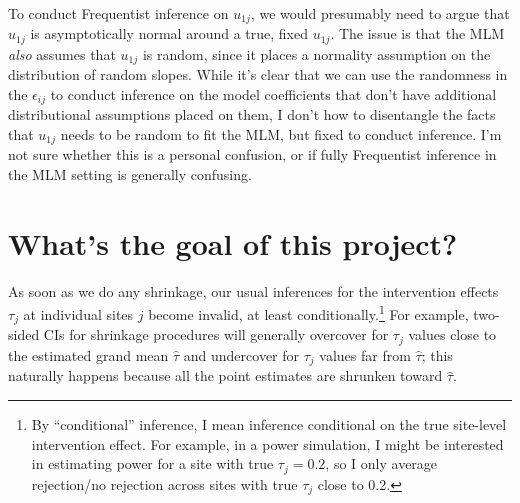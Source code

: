 \documentclass[]{article}
\begin{document}
To conduct Frequentist inference on $u_{1j}$, we would presumably need to argue that $\hat{u}_{1j}$ is asymptotically normal around a true, fixed $u_{1j}$.
The issue is that the MLM \textit{also} assumes that $u_{1j}$ is random, since it places a normality assumption on the distribution of random slopes.
While it's clear that we can use the randomness in the $\epsilon_{ij}$ to conduct inference on the model coefficients that don't have additional distributional assumptions placed on them, I don't how to disentangle the facts that $u_{1j}$ needs to be random to fit the MLM, but fixed to conduct inference.
I'm not sure whether this is a personal confusion, or if fully Frequentist inference in the MLM setting is generally confusing.





\section{What's the goal of this project?}

As soon as we do any shrinkage, our usual inferences for the intervention effects $\tau_j$ at individual sites $j$ become invalid, at least conditionally.\footnote{By ``conditional'' inference, I mean inference conditional on the true site-level intervention effect.
For example, in a power simulation, I might be interested in estimating power for a site with true $\tau_j = 0.2$, so I only average rejection/no rejection across sites with true $\tau_j$ close to 0.2.}
For example, two-sided CIs for shrinkage procedures will generally overcover for $\tau_j$ values close to the estimated grand mean $\hat{\tau}$ and undercover for $\tau_j$ values far from $\hat{\tau}$; this naturally happens because all the point estimates are shrunken toward $\hat{\tau}$.
\end{document}
